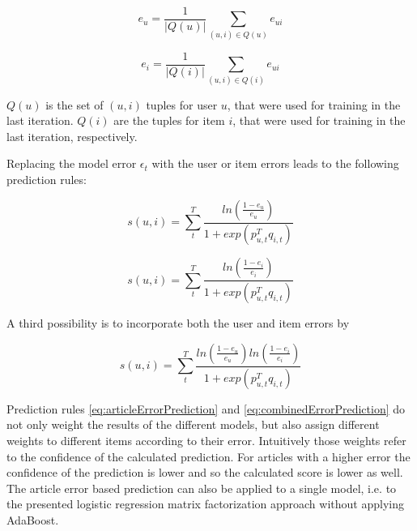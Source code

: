 \documentclass[10pt]{reportMaster}
\begin{document}
\begin{equation}
	\label{eq:userError}
	e_{u} = \frac{1}{|Q(u)|} \sum_{(u,i) \in Q(u)}{e_{ui}}
\end{equation}

\begin{equation}
	\label{eq:articleError}
	e_{i} = \frac{1}{|Q(i)|} \sum_{(u,i) \in Q(i)}{e_{ui}}
\end{equation}

$Q(u)$ is the set of $(u,i)$ tuples for user $u$, that were used for training in the last iteration.
$Q(i)$ are the tuples for item $i$, that were used for training in the last iteration, respectively.

Replacing the model error $\epsilon_t$ with the user or item errors leads to the following prediction rules:

\begin{equation}
\label{eq:userErrorPrediction}
	s(u,i) = \sum_t^T{\frac{ln(\frac{1 - e_u}{e_u})}{1 + exp(p_{u,t}^Tq_{i,t})}}
\end{equation}

\begin{equation}
\label{eq:articleErrorPrediction}
s(u,i) = \sum_t^T{\frac{ln(\frac{1 - e_i}{e_i})}{1 + exp(p_{u,t}^Tq_{i,t})}}
\end{equation}

A third possibility is to incorporate both the user and item errors by 

\begin{equation}
\label{eq:combinedErrorPrediction}
s(u,i) = \sum_t^T{\frac{ln(\frac{1 - e_u}{e_u})ln(\frac{1 - e_i}{e_i})}{1 + exp(p_{u,t}^Tq_{i,t})}}
\end{equation}

Prediction rules \ref{eq:articleErrorPrediction} and \ref{eq:combinedErrorPrediction} do not only weight the results of the different models, but also assign different weights to different items according to their error.
Intuitively those weights refer to the confidence of the calculated prediction.
For articles with a higher error the confidence of the prediction is lower and so the calculated score is lower as well.
The article error based prediction can also be applied to a single model, i.e. to the presented logistic regression matrix factorization approach without applying AdaBoost.









\end{document}
